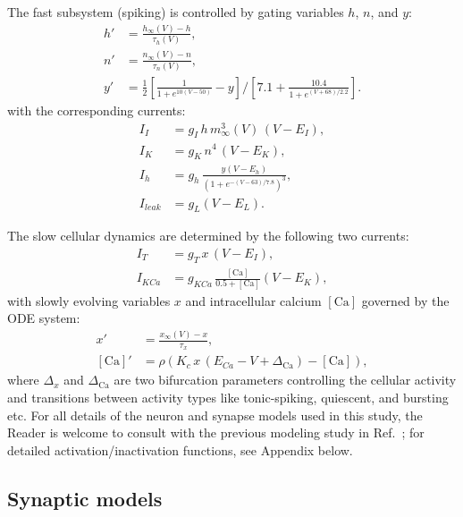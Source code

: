 \documentclass[nofootinbib,aip,amsmath,amssymb,preprint,twocolumn,floatfix,10pt]{revtex4-2}
\begin{document}
The fast subsystem (spiking) is controlled by gating variables $h$, $n$, and $y$:
\begin{align}
h' &= \frac{h_\infty(V) - h}{\tau_h(V)}, \\
n' &= \frac{n_\infty(V) - n}{\tau_n(V)}, \\
y' &= \frac{1}{2} \left[ \frac{1}{1 + e^{10(V-50)}} - y \right] / \left[ 7.1 + \frac{10.4}{1 + e^{(V+68)/2.2}} \right].
\end{align}
with the corresponding currents:
\begin{align}
I_{I} &= g_{I}\, h\, m_\infty^3(V)\, (V-E_{I}), \\
I_K &= g_K\, n^4\, (V-E_K), \\
I_h &= g_h\, \frac{y (V-E_h)}{(1 + e^{-(V-63)/7.8})^3}, \\
I_{leak} &= g_L (V-E_L).
\end{align}

The slow cellular dynamics are determined by the following two currents:
\begin{align}
I_{T} &= g_{T}\, x\, (V-E_{I}), \\
I_{KCa} &= g_{KCa}\, \frac{[\mathrm{Ca}]}{0.5 + [\mathrm{Ca}]} (V-E_K),
\end{align}
with slowly evolving variables $x$ and intracellular calcium $[\mathrm{Ca}]$ governed by the ODE system:
\begin{align}
x' &= \frac{x_\infty(V) - x}{\tau_x}, \\
[\mathrm{Ca}]' &= \rho \left( K_c\, x\, (E_{Ca} - V + \Delta_{\mathrm{Ca}}) - [\mathrm{Ca}] \right),
\end{align}
where $\Delta_x$ and $\Delta_{\mathrm{Ca}}$ are two bifurcation parameters controlling the cellular activity and transitions between activity types like tonic-spiking, quiescent, and bursting etc. 
For all details of the neuron and synapse models used in this study, the Reader is welcome to consult with the previous modeling study in Ref.~\cite{scully2024pairing}; for detailed activation/inactivation functions, see Appendix below.

\subsection{Synaptic models}
\end{document}
